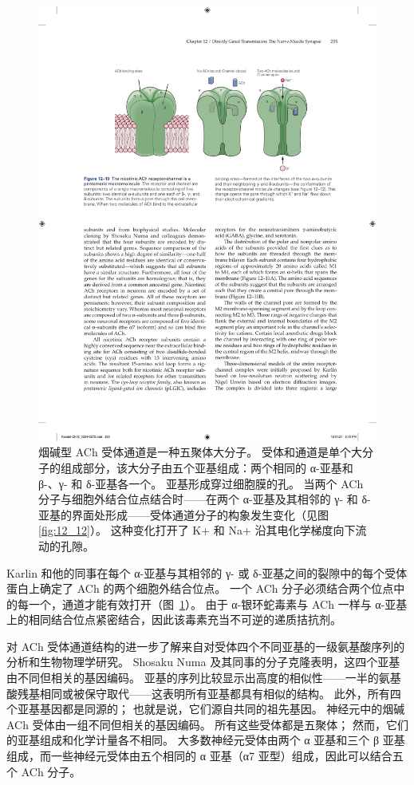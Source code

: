 \begin{figure}[htbp]
	\centering
	\includegraphics[width=0.8\linewidth]{chap12/fig_12_10}
	\caption{烟碱型 ACh 受体通道是一种五聚体大分子。 受体和通道是单个大分子的组成部分，该大分子由五个亚基组成：两个相同的 α-亚基和 β-、γ- 和 δ-亚基各一个。 亚基形成穿过细胞膜的孔。 当两个 ACh 分子与细胞外结合位点结合时——在两个 α-亚基及其相邻的 γ- 和 δ-亚基的界面处形成——受体通道分子的构象发生变化（见图 \ref{fig:12_12}）。 这种变化打开了 K+ 和 Na+ 沿其电化学梯度向下流动的孔隙。}
	\label{fig:12_10}
\end{figure}


Karlin 和他的同事在每个 α-亚基与其相邻的 γ- 或 δ-亚基之间的裂隙中的每个受体蛋白上确定了 ACh 的两个细胞外结合位点。
一个 ACh 分子必须结合两个位点中的每一个，通道才能有效打开（图~\ref{fig:12_10}）。
由于 α-银环蛇毒素与 ACh 一样与 α-亚基上的相同结合位点紧密结合，因此该毒素充当不可逆的递质拮抗剂。


对 ACh 受体通道结构的进一步了解来自对受体四个不同亚基的一级氨基酸序列的分析和生物物理学研究。
Shosaku Numa 及其同事的分子克隆表明，这四个亚基由不同但相关的基因编码。
亚基的序列比较显示出高度的相似性——一半的氨基酸残基相同或被保守取代——这表明所有亚基都具有相似的结构。 
此外，所有四个亚基基因都是同源的；
也就是说，它们源自共同的祖先基因。
神经元中的烟碱 ACh 受体由一组不同但相关的基因编码。
所有这些受体都是五聚体；
然而，它们的亚基组成和化学计量各不相同。
大多数神经元受体由两个 α 亚基和三个 β 亚基组成，而一些神经元受体由五个相同的 α 亚基（α7 亚型）组成，因此可以结合五个 ACh 分子。


